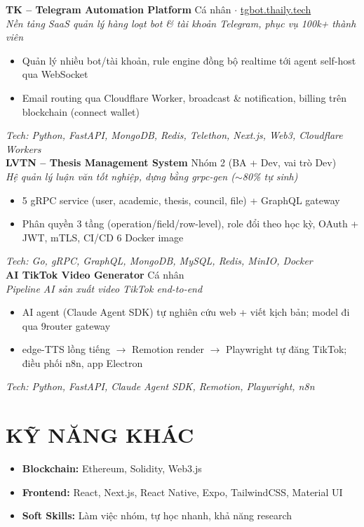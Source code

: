 \documentclass[11pt,a4paper]{article}
\begin{document}
\textbf{TK -- Telegram Automation Platform} \hfill Cá nhân $\cdot$ \href{https://tgbot.thaily.tech}{tgbot.thaily.tech} \\
\textit{Nền tảng SaaS quản lý hàng loạt bot \& tài khoản Telegram, phục vụ 100k+ thành viên} \\
\begin{itemize}[leftmargin=*, nosep]
    \item Quản lý nhiều bot/tài khoản, rule engine đồng bộ realtime tới agent self-host qua WebSocket
    \item Email routing qua Cloudflare Worker, broadcast \& notification, billing trên blockchain (connect wallet)
\end{itemize}
\textit{Tech: Python, FastAPI, MongoDB, Redis, Telethon, Next.js, Web3, Cloudflare Workers} \\[8pt]

\textbf{LVTN -- Thesis Management System} \hfill Nhóm 2 (BA + Dev, vai trò Dev) \\
\textit{Hệ quản lý luận văn tốt nghiệp, dựng bằng grpc-gen ($\sim$80\% tự sinh)} \\
\begin{itemize}[leftmargin=*, nosep]
    \item 5 gRPC service (user, academic, thesis, council, file) + GraphQL gateway
    \item Phân quyền 3 tầng (operation/field/row-level), role đổi theo học kỳ, OAuth + JWT, mTLS, CI/CD 6 Docker image
\end{itemize}
\textit{Tech: Go, gRPC, GraphQL, MongoDB, MySQL, Redis, MinIO, Docker} \\[8pt]

\textbf{AI TikTok Video Generator} \hfill Cá nhân \\
\textit{Pipeline AI sản xuất video TikTok end-to-end} \\
\begin{itemize}[leftmargin=*, nosep]
    \item AI agent (Claude Agent SDK) tự nghiên cứu web + viết kịch bản; model đi qua 9router gateway
    \item edge-TTS lồng tiếng $\rightarrow$ Remotion render $\rightarrow$ Playwright tự đăng TikTok; điều phối n8n, app Electron
\end{itemize}
\textit{Tech: Python, FastAPI, Claude Agent SDK, Remotion, Playwright, n8n}

\section{KỸ NĂNG KHÁC}
\begin{itemize}[leftmargin=*, nosep]
    \item \textbf{Blockchain:} Ethereum, Solidity, Web3.js
    \item \textbf{Frontend:} React, Next.js, React Native, Expo, TailwindCSS, Material UI
    \item \textbf{Soft Skills:} Làm việc nhóm, tự học nhanh, khả năng research
\end{itemize}
\end{document}
